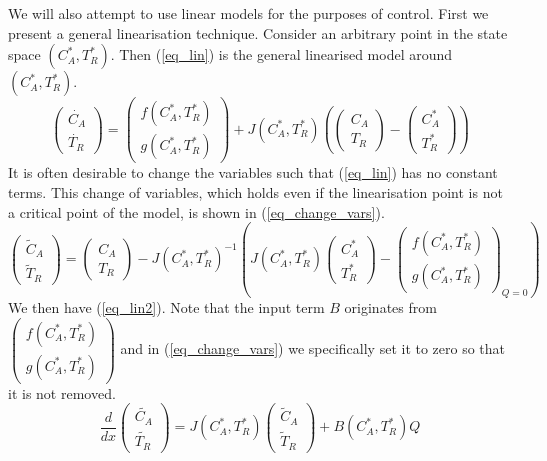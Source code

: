 \documentclass[../masters.tex]{subfiles}
\begin{document}
We will also attempt to use linear models for the purposes of control. First we present a general linearisation technique. Consider an arbitrary point in the state space $(C_A^*, T_R^*)$. Then (\ref{eq_lin}) is the general linearised model around $(C_A^*, T_R^*)$.
\begin{equation}
\begin{pmatrix}
\dot{C_A} \\ \dot{T_R}
\end{pmatrix} = \begin{pmatrix}
f(C_A^*, T_R^*) \\ g(C_A^*, T_R^*)
\end{pmatrix} + J(C_A^*, T_R^*) \left( \begin{pmatrix}
C_A \\ T_R
\end{pmatrix} - \begin{pmatrix}
C_A^* \\ T_R^* 
\end{pmatrix}\right)
\label{eq_lin}
\end{equation}
It is often desirable to change the variables such that (\ref{eq_lin}) has no constant terms. This change of variables, which holds even if the linearisation point is not a critical point of the model, is shown in (\ref{eq_change_vars}). 
\begin{equation}
\begin{pmatrix}
\tilde{C}_A \\ \tilde{T}_R
\end{pmatrix} = \begin{pmatrix}
C_A \\ T_R
\end{pmatrix} - J(C_A^*, T_R^*)^{-1}\left(J(C_A^*, T_R^*)\begin{pmatrix}
C_A^* \\ T_R^* 
\end{pmatrix} - \begin{pmatrix}
f(C_A^*, T_R^*) \\ g(C_A^*, T_R^*)
\end{pmatrix}_{Q=0} \right)
\label{eq_change_vars}
\end{equation}
We then have (\ref{eq_lin2}). Note that the input term $B$ originates from $\begin{pmatrix}
f(C_A^*, T_R^*) \\ g(C_A^*, T_R^*)
\end{pmatrix}$ and in (\ref{eq_change_vars}) we specifically set it to zero so that it is not removed.
\begin{equation}
\frac{d}{dx}\begin{pmatrix}
\tilde{C_A} \\ \tilde{T_R}
\end{pmatrix} =  J(C_A^*, T_R^*)\begin{pmatrix}
\tilde{C}_A \\ \tilde{T}_R
\end{pmatrix} + B(C_A^*, T_R^*)Q
\label{eq_lin2}
\end{equation}
\end{document}
